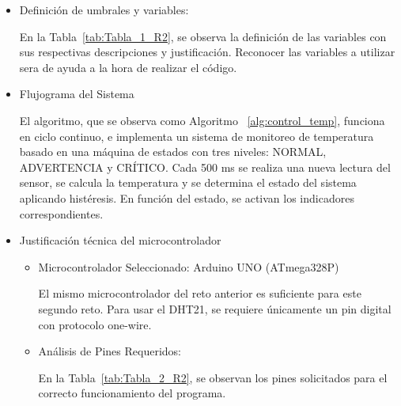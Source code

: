 \begin{itemize}
\begin{itemize}
\begin{itemize}
            \item Implementación obligatoria de histéresis para evitar inestabilidad en los límites.
            
            \item El sistema debe funcionar en ciclo continuo con temporización no bloqueante.
            
            \item La lectura del sensor debe ser promediada para reducir ruido.
            
        \end{itemize}
       
    \item Definición de umbrales y variables:

    En la Tabla~\ref{tab:Tabla_1_R2}, se observa la definición de las variables con sus respectivas descripciones y justificación. Reconocer las variables a utilizar sera de ayuda a la hora de realizar el código.

    

    \item Flujograma del Sistema

    El algoritmo, que se observa como Algoritmo ~\ref{alg:control_temp},
    funciona en ciclo continuo, e implementa un sistema de monitoreo de temperatura basado en una máquina de estados con tres niveles: NORMAL, ADVERTENCIA y CRÍTICO. Cada 500 ms se realiza una nueva lectura del sensor, se calcula la temperatura y se determina el estado del sistema aplicando histéresis. En función del estado, se activan los indicadores correspondientes.
    
    

    \item Justificación técnica del microcontrolador
        \begin{itemize}
            \item Microcontrolador Seleccionado: Arduino UNO (ATmega328P)

            El mismo microcontrolador del reto anterior es suficiente para este segundo reto.  Para usar el DHT21, se requiere únicamente un pin digital con protocolo one-wire.

            \item Análisis de Pines Requeridos:

            En la Tabla~\ref{tab:Tabla_2_R2}, se observan los pines solicitados para el correcto funcionamiento del programa.


\end{itemize}
\end{itemize}
\end{itemize}
